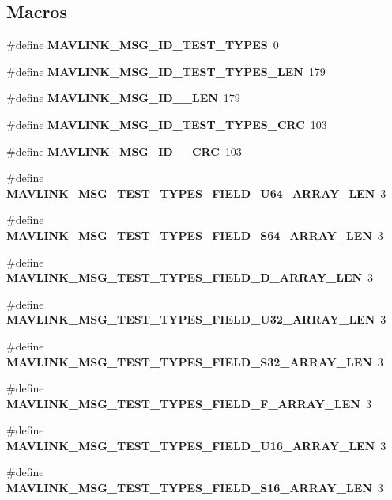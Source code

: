 \subsection*{Macros}
\begin{DoxyCompactItemize}
\item 
\#define \textbf{ M\+A\+V\+L\+I\+N\+K\+\_\+\+M\+S\+G\+\_\+\+I\+D\+\_\+\+T\+E\+S\+T\+\_\+\+T\+Y\+P\+ES}~0
\item 
\#define \textbf{ M\+A\+V\+L\+I\+N\+K\+\_\+\+M\+S\+G\+\_\+\+I\+D\+\_\+\+T\+E\+S\+T\+\_\+\+T\+Y\+P\+E\+S\+\_\+\+L\+EN}~179
\item 
\#define \textbf{ M\+A\+V\+L\+I\+N\+K\+\_\+\+M\+S\+G\+\_\+\+I\+D\+\_\+\_\+\+L\+EN}~179
\item 
\#define \textbf{ M\+A\+V\+L\+I\+N\+K\+\_\+\+M\+S\+G\+\_\+\+I\+D\+\_\+\+T\+E\+S\+T\+\_\+\+T\+Y\+P\+E\+S\+\_\+\+C\+RC}~103
\item 
\#define \textbf{ M\+A\+V\+L\+I\+N\+K\+\_\+\+M\+S\+G\+\_\+\+I\+D\+\_\+\_\+\+C\+RC}~103
\item 
\#define \textbf{ M\+A\+V\+L\+I\+N\+K\+\_\+\+M\+S\+G\+\_\+\+T\+E\+S\+T\+\_\+\+T\+Y\+P\+E\+S\+\_\+\+F\+I\+E\+L\+D\+\_\+\+U64\+\_\+\+A\+R\+R\+A\+Y\+\_\+\+L\+EN}~3
\item 
\#define \textbf{ M\+A\+V\+L\+I\+N\+K\+\_\+\+M\+S\+G\+\_\+\+T\+E\+S\+T\+\_\+\+T\+Y\+P\+E\+S\+\_\+\+F\+I\+E\+L\+D\+\_\+\+S64\+\_\+\+A\+R\+R\+A\+Y\+\_\+\+L\+EN}~3
\item 
\#define \textbf{ M\+A\+V\+L\+I\+N\+K\+\_\+\+M\+S\+G\+\_\+\+T\+E\+S\+T\+\_\+\+T\+Y\+P\+E\+S\+\_\+\+F\+I\+E\+L\+D\+\_\+\+D\+\_\+\+A\+R\+R\+A\+Y\+\_\+\+L\+EN}~3
\item 
\#define \textbf{ M\+A\+V\+L\+I\+N\+K\+\_\+\+M\+S\+G\+\_\+\+T\+E\+S\+T\+\_\+\+T\+Y\+P\+E\+S\+\_\+\+F\+I\+E\+L\+D\+\_\+\+U32\+\_\+\+A\+R\+R\+A\+Y\+\_\+\+L\+EN}~3
\item 
\#define \textbf{ M\+A\+V\+L\+I\+N\+K\+\_\+\+M\+S\+G\+\_\+\+T\+E\+S\+T\+\_\+\+T\+Y\+P\+E\+S\+\_\+\+F\+I\+E\+L\+D\+\_\+\+S32\+\_\+\+A\+R\+R\+A\+Y\+\_\+\+L\+EN}~3
\item 
\#define \textbf{ M\+A\+V\+L\+I\+N\+K\+\_\+\+M\+S\+G\+\_\+\+T\+E\+S\+T\+\_\+\+T\+Y\+P\+E\+S\+\_\+\+F\+I\+E\+L\+D\+\_\+\+F\+\_\+\+A\+R\+R\+A\+Y\+\_\+\+L\+EN}~3
\item 
\#define \textbf{ M\+A\+V\+L\+I\+N\+K\+\_\+\+M\+S\+G\+\_\+\+T\+E\+S\+T\+\_\+\+T\+Y\+P\+E\+S\+\_\+\+F\+I\+E\+L\+D\+\_\+\+U16\+\_\+\+A\+R\+R\+A\+Y\+\_\+\+L\+EN}~3
\item 
\#define \textbf{ M\+A\+V\+L\+I\+N\+K\+\_\+\+M\+S\+G\+\_\+\+T\+E\+S\+T\+\_\+\+T\+Y\+P\+E\+S\+\_\+\+F\+I\+E\+L\+D\+\_\+\+S16\+\_\+\+A\+R\+R\+A\+Y\+\_\+\+L\+EN}~3

\end{DoxyCompactItemize}
